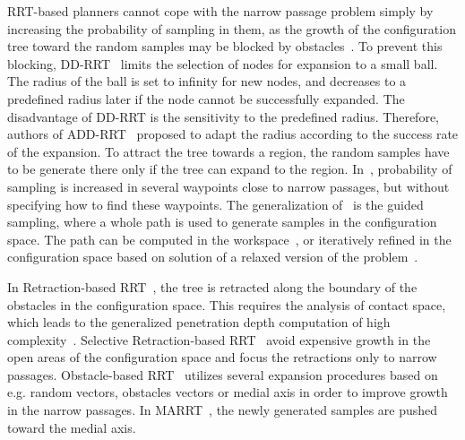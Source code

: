 \documentclass[usletter, 10pt, conference]{ieeeconf} %
\def\qrand{q_{rand}}
\def\qnear{q_{near}}
\begin{document}
RRT-based planners cannot cope with the narrow passage problem simply by increasing the probability of sampling in them, as the
growth of the configuration tree toward the random samples may be blocked by obstacles~\cite{vonasekphd}.
To prevent this blocking, DD-RRT~\cite{yershovaDDRRT} limits the selection of nodes for expansion to a small ball. 
The radius of the ball is set to infinity for new nodes, and decreases to a predefined radius later if the node cannot be successfully expanded.
The disadvantage of DD-RRT is the sensitivity to the predefined radius.
Therefore, authors of ADD-RRT~\cite{jailletADRRT} proposed to adapt the radius  according to the success rate of the expansion.
To attract the tree towards a region, the random samples have to be generate there only if the tree can expand to the region.
In~\cite{kardossRRTKK}, probability of sampling is increased in several waypoints close to narrow passages, but without specifying
how to find these waypoints.
The generalization of~\cite{kardossRRTKK} is the guided sampling, where a whole path is used
to generate samples in the configuration space.
The path can be computed in the workspace~\cite{vonasek2009rrt}, or iteratively refined in the configuration space based on solution of a relaxed version of the problem~\cite{bayazitIRC}.


In Retraction-based RRT~\cite{zhangRetraction}, the tree is retracted along the boundary of the obstacles in the configuration space.
This requires the analysis of contact space, which leads to the generalized penetration depth computation of high complexity~\cite{zhang2008fast,he2016efficient}. %
Selective Retraction-based RRT~\cite{lee2012srrrt} avoid expensive growth in the open areas of the configuration space and focus
the retractions only to narrow passages.
Obstacle-based RRT~\cite{amatoOBRRT} utilizes several expansion procedures based on e.g. random vectors, obstacles vectors or medial axis in order to improve growth in the narrow passages.
In MARRT~\cite{denny2014marrt}, the newly generated samples are pushed toward the medial axis.
\end{document}
